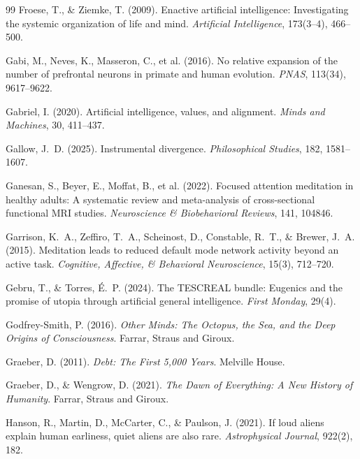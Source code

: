 \documentclass[11pt,twocolumn]{article}
\begin{document}
\begin{thebibliography}{99}
 Froese, T., \& Ziemke, T. (2009). Enactive artificial intelligence: Investigating the systemic organization of life and mind. \emph{Artificial Intelligence}, 173(3--4), 466--500.

 Gabi, M., Neves, K., Masseron, C., et al. (2016). No relative expansion of the number of prefrontal neurons in primate and human evolution. \emph{PNAS}, 113(34), 9617--9622.

 Gabriel, I. (2020). Artificial intelligence, values, and alignment. \emph{Minds and Machines}, 30, 411--437.

 Gallow, J.~D. (2025). Instrumental divergence. \emph{Philosophical Studies}, 182, 1581--1607.

 Ganesan, S., Beyer, E., Moffat, B., et al. (2022). Focused attention meditation in healthy adults: A systematic review and meta-analysis of cross-sectional functional MRI studies. \emph{Neuroscience \& Biobehavioral Reviews}, 141, 104846.

 Garrison, K.~A., Zeffiro, T.~A., Scheinost, D., Constable, R.~T., \& Brewer, J.~A. (2015). Meditation leads to reduced default mode network activity beyond an active task. \emph{Cognitive, Affective, \& Behavioral Neuroscience}, 15(3), 712--720.

 Gebru, T., \& Torres, É.~P. (2024). The TESCREAL bundle: Eugenics and the promise of utopia through artificial general intelligence. \emph{First Monday}, 29(4).

 Godfrey-Smith, P. (2016). \emph{Other Minds: The Octopus, the Sea, and the Deep Origins of Consciousness}. Farrar, Straus and Giroux.

 Graeber, D. (2011). \emph{Debt: The First 5,000 Years}. Melville House.

 Graeber, D., \& Wengrow, D. (2021). \emph{The Dawn of Everything: A New History of Humanity}. Farrar, Straus and Giroux.

 Hanson, R., Martin, D., McCarter, C., \& Paulson, J. (2021). If loud aliens explain human earliness, quiet aliens are also rare. \emph{Astrophysical Journal}, 922(2), 182.


\end{thebibliography}
\end{document}
